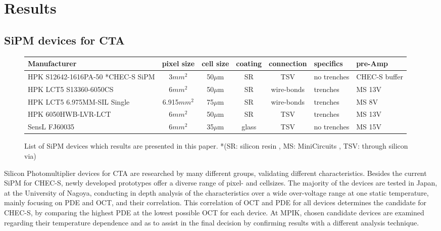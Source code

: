 \documentclass[12pt,article,type=msc,colorback,accentcolor=tud9c]{tudthesis}
\begin{document}
\clearpage
\newpage
\section{\Large Results}
\label{sec:results_ch}
\subsection{SiPM devices for CTA}

\begin{centering}
\begin{figure}[h]
\begin{tabular}{ |p{4.5cm} | c | c | c | c | p{1.5cm} | p{1.5cm} |}
    \hline
    Manufacturer                            & pixel size  & cell size & coating & connection & specifics               & pre-Amp       \\ \hline
    HPK S12642-1616PA-50  *CHEC-S SiPM               & 3$mm^2$     & 50$\mu$m  & SR      & TSV        &  no trenches & CHEC-S buffer \\ \hline
    HPK LCT5 S13360-6050CS                  & 6$mm^2$     & 50$\mu$m  & SR      & wire-bonds & trenches                & MS 13V        \\ \hline
    HPK LCT5 6.975MM-SIL Single                      & 6.915$mm^2$ & 75$\mu$m  & SR      & wire-bonds & trenches                & MS 8V         \\ \hline
    HPK 6050HWB-LVR-LCT                     & 6$mm^2$     & 50$\mu$m  & SR      & TSV        & trenches                & MS 13V        \\ \hline
    SensL FJ60035                           & 6$mm^2$     & 35$\mu$m  & glass   & TSV        & no trenches             & MS 15V        \\
    \hline
\end{tabular}
\caption{List of SiPM devices which results are presented in this paper. *(SR: silicon resin , MS: MiniCircuits , TSV: through silicon via)}
\end{figure}
\end{centering}
Silicon Photomultiplier devices for CTA are researched by many different groups, validating different characteristics. Besides the current SiPM for CHEC-S, newly developed prototypes offer a diverse range of pixel- and cellsizes. The majority of the devices are tested in Japan, at the University of Nagoya, conducting in depth analysis of the characteristics over a wide over-voltage range at one static temperature, mainly focusing on PDE and OCT, and their correlation. This correlation of OCT and PDE for all devices determines the candidate for CHEC-S, by comparing the highest PDE at the lowest possible OCT for each device. At MPIK, chosen candidate devices are examined regarding their temperature dependence and as to assist in the final decision by confirming results with a different analysis technique.\\
\end{document}
